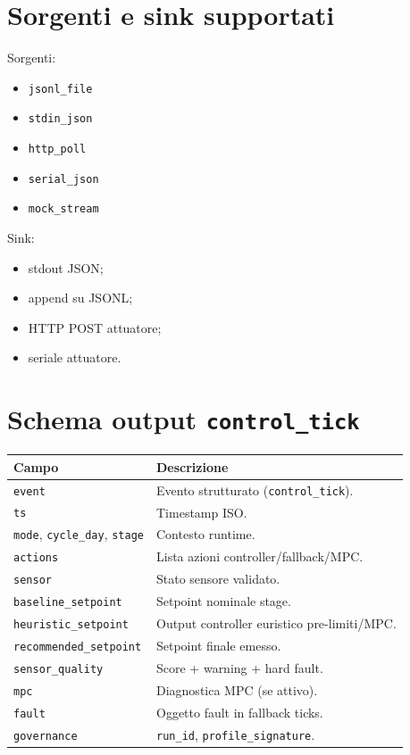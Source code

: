 ﻿\documentclass[11pt,a4paper]{report}
\begin{document}
\section{Sorgenti e sink supportati}
Sorgenti:
\begin{itemize}
  \item \texttt{jsonl\_file}
  \item \texttt{stdin\_json}
  \item \texttt{http\_poll}
  \item \texttt{serial\_json}
  \item \texttt{mock\_stream}
\end{itemize}
Sink:
\begin{itemize}
  \item stdout JSON;
  \item append su JSONL;
  \item HTTP POST attuatore;
  \item seriale attuatore.
\end{itemize}

\section{Schema output \texttt{control\_tick}}
\begin{longtable}{@{}p{3.8cm}p{9.4cm}@{}}
\toprule
Campo & Descrizione \\ \midrule
\texttt{event} & Evento strutturato (\texttt{control\_tick}). \\
\texttt{ts} & Timestamp ISO. \\
\texttt{mode}, \texttt{cycle\_day}, \texttt{stage} & Contesto runtime. \\
\texttt{actions} & Lista azioni controller/fallback/MPC. \\
\texttt{sensor} & Stato sensore validato. \\
\texttt{baseline\_setpoint} & Setpoint nominale stage. \\
\texttt{heuristic\_setpoint} & Output controller euristico pre-limiti/MPC. \\
\texttt{recommended\_setpoint} & Setpoint finale emesso. \\
\texttt{sensor\_quality} & Score + warning + hard fault. \\
\texttt{mpc} & Diagnostica MPC (se attivo). \\
\texttt{fault} & Oggetto fault in fallback ticks. \\
\texttt{governance} & \texttt{run\_id}, \texttt{profile\_signature}. \\
\bottomrule
\end{longtable}
\end{document}
